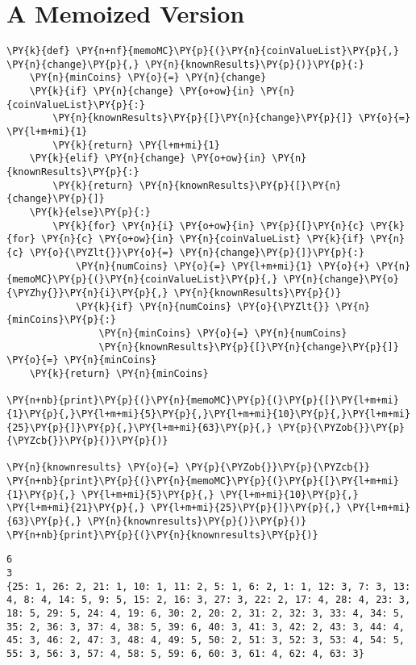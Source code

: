 \section{A Memoized Version}


\begin{Verbatim}[commandchars=\\\{\}]
\PY{k}{def} \PY{n+nf}{memoMC}\PY{p}{(}\PY{n}{coinValueList}\PY{p}{,} \PY{n}{change}\PY{p}{,} \PY{n}{knownResults}\PY{p}{)}\PY{p}{:}
    \PY{n}{minCoins} \PY{o}{=} \PY{n}{change}
    \PY{k}{if} \PY{n}{change} \PY{o+ow}{in} \PY{n}{coinValueList}\PY{p}{:}
        \PY{n}{knownResults}\PY{p}{[}\PY{n}{change}\PY{p}{]} \PY{o}{=} \PY{l+m+mi}{1}
        \PY{k}{return} \PY{l+m+mi}{1}
    \PY{k}{elif} \PY{n}{change} \PY{o+ow}{in} \PY{n}{knownResults}\PY{p}{:}
        \PY{k}{return} \PY{n}{knownResults}\PY{p}{[}\PY{n}{change}\PY{p}{]}
    \PY{k}{else}\PY{p}{:}
        \PY{k}{for} \PY{n}{i} \PY{o+ow}{in} \PY{p}{[}\PY{n}{c} \PY{k}{for} \PY{n}{c} \PY{o+ow}{in} \PY{n}{coinValueList} \PY{k}{if} \PY{n}{c} \PY{o}{\PYZlt{}}\PY{o}{=} \PY{n}{change}\PY{p}{]}\PY{p}{:}
            \PY{n}{numCoins} \PY{o}{=} \PY{l+m+mi}{1} \PY{o}{+} \PY{n}{memoMC}\PY{p}{(}\PY{n}{coinValueList}\PY{p}{,} \PY{n}{change}\PY{o}{\PYZhy{}}\PY{n}{i}\PY{p}{,} \PY{n}{knownResults}\PY{p}{)}
            \PY{k}{if} \PY{n}{numCoins} \PY{o}{\PYZlt{}} \PY{n}{minCoins}\PY{p}{:}
                \PY{n}{minCoins} \PY{o}{=} \PY{n}{numCoins}
                \PY{n}{knownResults}\PY{p}{[}\PY{n}{change}\PY{p}{]} \PY{o}{=} \PY{n}{minCoins}
    \PY{k}{return} \PY{n}{minCoins}

\PY{n+nb}{print}\PY{p}{(}\PY{n}{memoMC}\PY{p}{(}\PY{p}{[}\PY{l+m+mi}{1}\PY{p}{,}\PY{l+m+mi}{5}\PY{p}{,}\PY{l+m+mi}{10}\PY{p}{,}\PY{l+m+mi}{25}\PY{p}{]}\PY{p}{,}\PY{l+m+mi}{63}\PY{p}{,} \PY{p}{\PYZob{}}\PY{p}{\PYZcb{}}\PY{p}{)}\PY{p}{)}

\PY{n}{knownresults} \PY{o}{=} \PY{p}{\PYZob{}}\PY{p}{\PYZcb{}}
\PY{n+nb}{print}\PY{p}{(}\PY{n}{memoMC}\PY{p}{(}\PY{p}{[}\PY{l+m+mi}{1}\PY{p}{,} \PY{l+m+mi}{5}\PY{p}{,} \PY{l+m+mi}{10}\PY{p}{,} \PY{l+m+mi}{21}\PY{p}{,} \PY{l+m+mi}{25}\PY{p}{]}\PY{p}{,} \PY{l+m+mi}{63}\PY{p}{,} \PY{n}{knownresults}\PY{p}{)}\PY{p}{)}
\PY{n+nb}{print}\PY{p}{(}\PY{n}{knownresults}\PY{p}{)}
\end{Verbatim}

\begin{Verbatim}
6
3
{25: 1, 26: 2, 21: 1, 10: 1, 11: 2, 5: 1, 6: 2, 1: 1, 12: 3, 7: 3, 13: 4, 8: 4, 14: 5, 9: 5, 15: 2, 16: 3, 27: 3, 22: 2, 17: 4, 28: 4, 23: 3, 18: 5, 29: 5, 24: 4, 19: 6, 30: 2, 20: 2, 31: 2, 32: 3, 33: 4, 34: 5, 35: 2, 36: 3, 37: 4, 38: 5, 39: 6, 40: 3, 41: 3, 42: 2, 43: 3, 44: 4, 45: 3, 46: 2, 47: 3, 48: 4, 49: 5, 50: 2, 51: 3, 52: 3, 53: 4, 54: 5, 55: 3, 56: 3, 57: 4, 58: 5, 59: 6, 60: 3, 61: 4, 62: 4, 63: 3}
\end{Verbatim}


